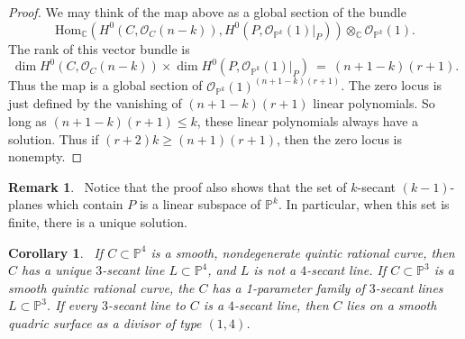 \documentclass[twoside,12pt,reqno]{amsart}
\theoremstyle{plain}
\newtheorem{cor}[thm]{Corollary}
\theoremstyle{definition}
\newtheorem{Remark}[thm]{Remark}
\newcommand{\CC}{\mathbb{C}}
\newcommand{\PP}{\mathbb{P}}
\def\ps{\vspace{4pt}}
\newcommand{\OO}{\mathcal O}
\begin{document}
\begin{proof}
\ps

We may think of the map above as a global section of the bundle
\begin{equation}
\text{Hom}_\CC(H^0(C,\OO_C(n-k)),H^0(P,\OO_{\PP^k}(1)|_P))\otimes_\CC
\OO_{\PP^k}(1). 
\end{equation}
The rank of this vector bundle is 
\begin{equation}
\dim H^0(C,\OO_C(n-k))\times \dim H^0(P,\OO_{\PP^k}(1)|_P)
~=~ (n+1-k)(r+1).
\end{equation}
Thus the map is a global section of $\OO_{\PP^k}(1)^{(n+1-k)(r+1)}$.
The zero locus is just defined by the vanishing of $(n+1-k)(r+1)$
linear polynomials.  So long as $(n+1-k)(r+1)\leq k$, these linear
polynomials always have a solution.  Thus if $(r+2)k\geq (n+1)(r+1)$,
then the zero locus is nonempty.
\end{proof}

\ps

\begin{Remark}~\label{rem-rncsec} Notice that the proof also shows
that the set of 
$k$-secant $(k-1)$-planes which contain $P$ is a linear subspace of
$\PP^k$.  In particular, when this set is finite, there is a unique
solution.  
\end{Remark}

\ps

\begin{cor}~\label{cor-3sec50}  If $C\subset \PP^4$ is a smooth,
nondegenerate quintic rational curve, then $C$ 
has a unique $3$-secant line $L\subset \PP^4$, and $L$ is not a
$4$-secant line.  If $C\subset \PP^3$ is a smooth quintic rational
curve, the $C$ has a 1-parameter family of $3$-secant lines $L\subset
\PP^3$.  If every $3$-secant line to $C$ is a $4$-secant line, then
$C$ lies on a smooth quadric surface as a divisor of type $(1,4)$.
\end{cor}
\end{document}
